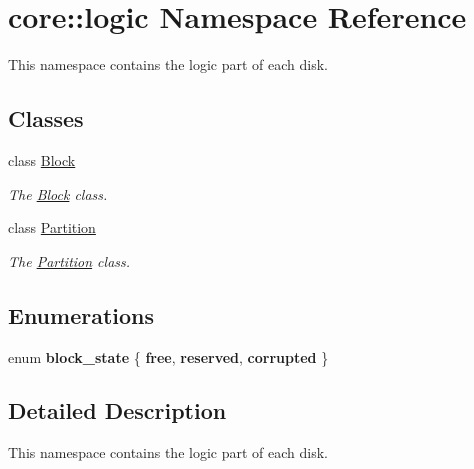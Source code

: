 \hypertarget{namespacecore_1_1logic}{}\section{core\+:\+:logic Namespace Reference}
\label{namespacecore_1_1logic}


This namespace contains the logic part of each disk.  


\subsection*{Classes}
\begin{DoxyCompactItemize}
\item 
class \mbox{\hyperlink{classcore_1_1logic_1_1_block}{Block}}
\begin{DoxyCompactList}\small\item\em The \mbox{\hyperlink{classcore_1_1logic_1_1_block}{Block}} class. \end{DoxyCompactList}\item 
class \mbox{\hyperlink{classcore_1_1logic_1_1_partition}{Partition}}
\begin{DoxyCompactList}\small\item\em The \mbox{\hyperlink{classcore_1_1logic_1_1_partition}{Partition}} class. \end{DoxyCompactList}\end{DoxyCompactItemize}
\subsection*{Enumerations}
\begin{DoxyCompactItemize}
\item 
\mbox{\label{namespacecore_1_1logic_af0520d76037e168c32e9bd80ba47eaae}} 
enum {\bfseries block\+\_\+state} \{ {\bfseries free}, 
{\bfseries reserved}, 
{\bfseries corrupted}
 \}
\end{DoxyCompactItemize}


\subsection{Detailed Description}
This namespace contains the logic part of each disk. 